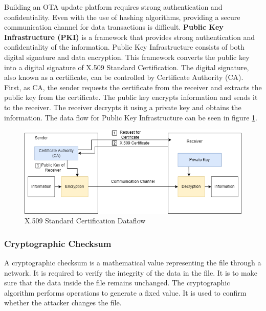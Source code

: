 \documentclass[12pt,a4paper]{article}
\begin{document}
Building an OTA update platform requires strong authentication and confidentiality. Even with the use of hashing algorithms, providing a secure communication channel for data transactions is difficult. \textbf{Public Key Infrastructure (PKI)} is a framework that provides strong authentication and confidentiality of the information. Public Key Infrastructure consists of both digital signature and data encryption. This framework converts the public key into a digital signature of X.509 Standard Certification. The digital signature, also known as a certificate, can be controlled by Certificate Authority (CA). First, as CA, the sender requests the certificate from the receiver and extracts the public key from the certificate. The public key encrypts information and sends it to the receiver. The receiver decrypts it using a private key and obtains the information. The data flow for Public Key Infrastructure can be seen in figure \ref{x509}. \cite{r23}


\begin{figure}[H]
\centering
\includegraphics[scale=0.65]{x509.PNG}
\caption{X.509 Standard Certification Dataflow \cite{r23}}
\label{x509}
\end{figure}

\subsubsection{Cryptographic Checksum}

A cryptographic checksum is a mathematical value representing the file through a network. It is required to verify the integrity of the data in the file. It is to make sure that the data inside the file remains unchanged. The cryptographic algorithm performs operations to generate a fixed value. It is used to confirm whether the attacker changes the file. \cite{r48} \\
\end{document}
